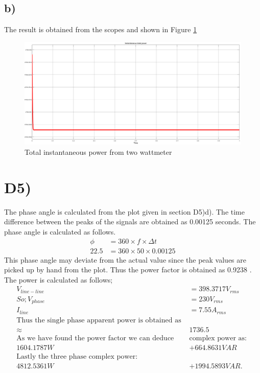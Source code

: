 \documentclass[letterpaper,12pt]{article}
\begin{document}
\subsection{b)} 
The result is obtained from the scopes and shown in Figure \ref*{D4b}
\begin{figure}[H]
    \centering
    \includegraphics[width = 1\textwidth]{4b.png}
    \caption{Total instantaneous power from two wattmeter}
    \label{D4b}
\end{figure}


\section{D5)}
The phase angle is calculated from the plot given in section D5)d). The time difference between the peaks of the signals are obtained as 0.00125 seconds. The phase angle is calculated as follows.
\begin{equation}
    \begin{split}
        \phi &= 360 \times f \times \Delta t\\
        22.5 &= 360 \times 50 \times 0.00125
    \end{split}
\end{equation}
This phase angle may deviate from the actual value since the peak values are picked up by hand from the plot. Thus the power factor is obtained as 0.9238 . The power is calculated as follows;
\begin{equation}
    \begin{split}
        V_{line-line} &= 398.3717 V_{rms}\\
        So; V_{phase} &= 230 V_{rms}\\
        I_{line} &= 7.55  A_{rms}\\
        \textrm{Thus the single phase apparent power is obtained as  } \\
        \approx & 1736.5\\
        \textrm{As we have found the power factor   we can deduce} & \textrm{complex power as:  } \\
         1604.1787 W &+ 664.8631 VAR \\
        \textrm{Lastly the three phase complex power: } \\
         4812.5361 W & + 1994.5893 VAR .   
    \end{split}
\end{equation} 
\end{document}
